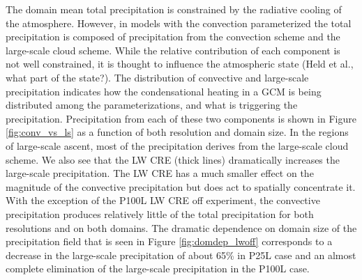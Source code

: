 \documentclass[draft]{agujournal2019}
\begin{document}
The domain mean total precipitation is constrained by the radiative cooling of the atmosphere.  However, in 
models with the convection parameterized the 
total precipitation is composed of precipitation from the convection scheme and the large-scale cloud scheme. 
While the relative contribution of each component is not well constrained, it is thought to influence the 
atmospheric state (Held et al., what part of the state?). 
The distribution of convective and large-scale precipitation indicates how the condensational heating
in a GCM is being distributed among the parameterizations, and what is triggering the precipitation.  
Precipitation from each of these two components is
shown in Figure \ref{fig:conv_vs_ls} as a function of both resolution and domain size.  
In the regions of large-scale ascent, most of the 
precipitation derives from the large-scale cloud scheme.  We also see that the LW CRE (thick lines) dramatically increases
the large-scale precipitation.  The LW CRE has a much smaller effect on the magnitude of the convective precipitation 
but does act to spatially concentrate it.  With the exception 
of the P100L LW CRE off experiment, the convective precipitation produces relatively little of the total precipitation for 
both resolutions and on both domains.  The dramatic dependence on domain size of the precipitation field that is 
seen in Figure \ref{fig:domdep_lwoff} corresponds to a decrease in the large-scale precipitation of about 65\% in P25L case
and an almost complete elimination of the large-scale precipitation in the P100L case.    
\end{document}
